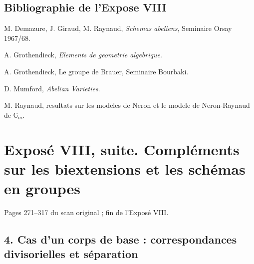 \documentclass[11pt]{article}
\providecommand{\Spec}{\operatorname{Spec}}
\providecommand{\Pic}{\operatorname{Pic}}
\providecommand{\Ker}{\operatorname{Ker}}
\providecommand{\Gm}{\mathbb G_m}
\providecommand{\Hom}{\operatorname{Hom}}
\providecommand{\Ext}{\operatorname{Ext}}
\providecommand{\id}{\operatorname{id}}
\begin{document}
\subsection*{Bibliographie de l'Expose VIII}
\begin{enumerate}[label={[\arabic*]}]
\item M. Demazure, J. Giraud, M. Raynaud, \emph{Schemas abeliens}, Seminaire Orsay 1967/68.
\item A. Grothendieck, \emph{Elements de geometrie algebrique}.
\item A. Grothendieck, Le groupe de Brauer, Seminaire Bourbaki.
\item D. Mumford, \emph{Abelian Varieties}.
\item M. Raynaud, resultats sur les modeles de Neron et le modele de Neron-Raynaud de \(\Gm\).
\end{enumerate}



\providecommand{\cG}{\mathcal G}
\providecommand{\cD}{\mathcal D}
\providecommand{\cF}{\mathcal F}
\providecommand{\cL}{\mathcal L}
\providecommand{\cM}{\mathcal M}
\providecommand{\cN}{\mathcal N}
\providecommand{\Gm}{\mathbb G_m}
\providecommand{\Ga}{\mathbb G_a}
\providecommand{\ZZ}{\mathbb Z}
\providecommand{\QQ}{\mathbb Q}
\providecommand{\Pic}{\operatorname{Pic}}
\providecommand{\Biext}{\operatorname{Biext}}
\providecommand{\Ext}{\operatorname{Ext}}
\providecommand{\Hom}{\operatorname{Hom}}
\providecommand{\Ker}{\operatorname{Ker}}
\providecommand{\Spec}{\operatorname{Spec}}
\providecommand{\supp}{\operatorname{supp}}
\providecommand{\Div}{\operatorname{Div}}
\providecommand{\NS}{\operatorname{NS}}
\providecommand{\Tate}{\operatorname{T}}
\providecommand{\Tr}{\operatorname{Tr}}
\providecommand{\codim}{\operatorname{codim}}
\providecommand{\im}{\operatorname{Im}}
\providecommand{\id}{\mathrm{id}}
\providecommand{\Sym}{\operatorname{Sym}}
\providecommand{\disc}{\operatorname{disc}}


\section*{Exposé VIII, suite. Compléments sur les biextensions et les schémas en groupes}
\begin{center}
Pages 271--317 du scan original ; fin de l'Exposé VIII.
\end{center}

\subsection*{4. Cas d'un corps de base : correspondances divisorielles et séparation}
\end{document}
